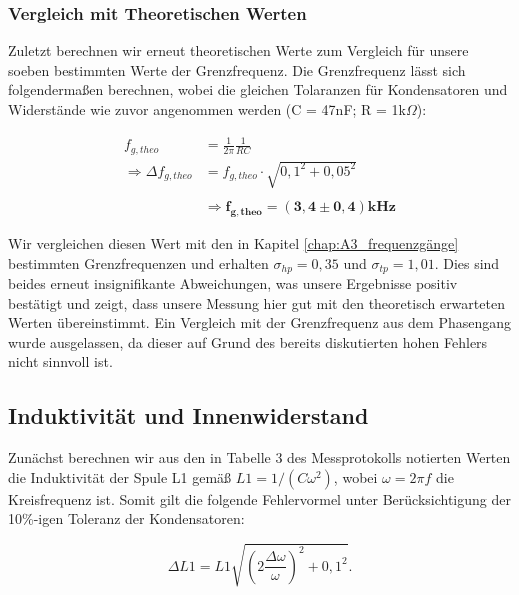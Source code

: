 \documentclass{article}
\begin{document}
\phantom{.}

\newpage

\subsubsection{Vergleich mit Theoretischen Werten}

Zuletzt berechnen wir erneut theoretischen Werte zum Vergleich für unsere soeben bestimmten Werte der Grenzfrequenz. Die Grenzfrequenz lässt sich folgendermaßen berechnen, wobei die gleichen Tolaranzen für Kondensatoren und Widerstände wie zuvor angenommen werden (C = 47nF; R = 1k$\Omega$):

\begin{equation}
    \begin{split}
        f_{g,theo} &= \frac{1}{2\pi} \frac{1}{RC} \\
        \Rightarrow \Delta f_{g,theo} &= f_{g,theo} \cdot \sqrt{0,1^2 + 0,05^2} \\ \\
        &\Rightarrow \bm{f_{g,theo} = (3,4 \pm 0,4)} \textbf{kHz}
    \end{split}
\end{equation}

Wir vergleichen diesen Wert mit den in Kapitel \ref{chap:A3_frequenzgänge} bestimmten Grenzfrequenzen und erhalten $\sigma_{hp} = 0,35$ und $\sigma_{tp} = 1,01$. Dies sind beides erneut insignifikante Abweichungen, was unsere Ergebnisse positiv bestätigt und zeigt, dass unsere Messung hier gut mit den theoretisch erwarteten Werten übereinstimmt. Ein Vergleich mit der Grenzfrequenz aus dem Phasengang wurde ausgelassen, da dieser auf Grund des bereits diskutierten hohen Fehlers nicht sinnvoll ist.   


\clearpage
\newpage

\subsection{Induktivität und Innenwiderstand} \label{kap:mean_Induktivität}

Zunächst berechnen wir aus den in Tabelle 3 des Messprotokolls notierten Werten die Induktivität der Spule L1 gemäß $L1 = 1/(C \omega^2)$, wobei $\omega = 2 \pi f$ die Kreisfrequenz ist. Somit gilt die folgende Fehlervormel unter Berücksichtigung der 10\%-igen Toleranz der Kondensatoren:

\begin{equation}
    \Delta L1 = L1 \sqrt{\left( 2 \frac{\Delta \omega}{\omega} \right)^2 + 0,1^2}.
\end{equation}
\end{document}
